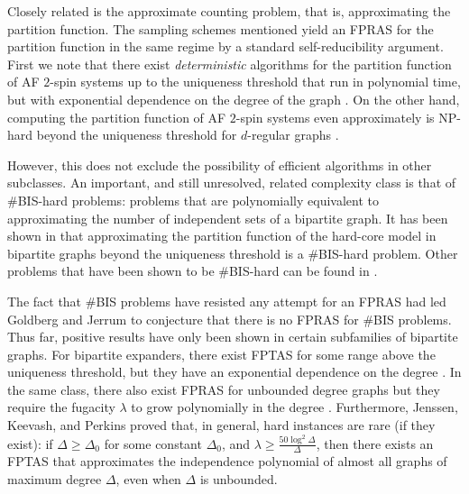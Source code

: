 \documentclass[reqno,a4paper,11pt]{amsart}
\newcommand{\lam}{\lambda}
\begin{document}
Closely related is the approximate counting problem, that is, approximating the partition function. The sampling schemes mentioned yield an FPRAS for the partition function in the same regime by a standard self-reducibility argument. 
First we note that there exist \textit{deterministic} algorithms for the partition function of AF $2$-spin systems up to the uniqueness threshold that run in polynomial time, but with exponential dependence on the degree of the graph \cite{li2013correlation}. On the other hand, computing the partition function of AF $2$-spin systems even approximately is NP-hard beyond the uniqueness threshold for $d$-regular graphs \cite{SuSly12}.

However, this does not exclude the possibility of efficient algorithms in other subclasses. An important, and still unresolved, related complexity class is that of \#BIS-hard problems: problems that are polynomially equivalent to approximating the number of independent sets of a bipartite graph. It has been shown in \cite{cai2016hardness} that approximating the partition function of the hard-core model in bipartite graphs beyond the uniqueness threshold is a \#BIS-hard problem. Other problems that have been shown to be \#BIS-hard can be found in \cite{chebolu2012complexity,galanis2016approximately,goldberg2012approximating}.

The fact that \#BIS problems have resisted any attempt for an FPRAS had led Goldberg and Jerrum \cite{goldberg2012approximating} to conjecture that there is no FPRAS for \#BIS problems. Thus far, positive results have only been shown in certain subfamilies of bipartite graphs. For bipartite expanders, there exist FPTAS for some range above the uniqueness threshold, but they have an exponential dependence on the degree \cite{JePePo23}. In the same class, there also exist FPRAS for unbounded degree graphs but they require the fugacity $\lam$ to grow polynomially in the degree \cite{CheGaGoPeSteVi21}. Furthermore, Jenssen, Keevash, and Perkins \cite{JeKePe20} proved that, in general, hard instances are rare (if they exist): if $\Delta\geq\Delta_0$ for some constant $\Delta_0$, and $\lam\geq \frac{50\log^2\Delta}{\Delta}$, then there exists an FPTAS that approximates the independence polynomial of almost all graphs of maximum degree $\Delta$, even when $\Delta$ is unbounded.
\end{document}
